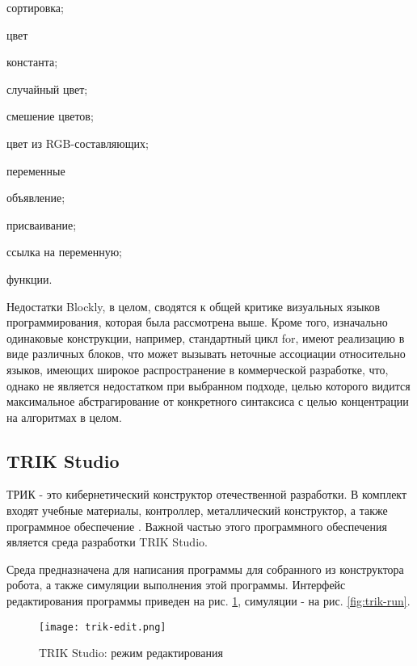 \begin{itemize*}
\begin{itemize*}
		\item сортировка;
	\end{itemize*}
	\item цвет
	\begin{itemize*}
		\item константа;
		\item случайный цвет;
		\item смешение цветов;
		\item цвет из RGB-составляющих;
	\end{itemize*}
	\item переменные
	\begin{itemize*}
		\item объявление;
		\item присваивание;
		\item ссылка на переменную;
	\end{itemize*}
	\item функции.
\end{itemize*}


Недостатки Blockly, в целом, сводятся к общей критике визуальных языков программирования, которая была рассмотрена выше. Кроме того, изначально одинаковые конструкции, например, стандартный цикл for, имеют реализацию в виде различных блоков, что может вызывать неточные ассоциации относительно языков, имеющих широкое распространение в коммерческой разработке, что, однако не является недостатком при выбранном подходе, целью которого видится максимальное абстрагирование от конкретного синтаксиса с целью концентрации на алгоритмах в целом.

\subsection{TRIK Studio}

ТРИК - это кибернетический конструктор отечественной разработки. В комплект входят учебные материалы, контроллер, металлический конструктор, а также программное обеспечение \cite{trik}. Важной частью этого программного обеспечения является среда разработки TRIK Studio. 

Среда предназначена для написания программы для собранного из конструктора робота, а также симуляции выполнения этой программы. Интерфейс редактирования программы приведен на рис. \ref{fig:trik-edit}, симуляции - на рис. \ref{fig:trik-run}.

\begin{figure}[htbp]
	\centering
	\texttt{[image: trik-edit.png]}
	\caption{TRIK Studio: режим редактирования}%
	\label{fig:trik-edit}
\end{figure}

